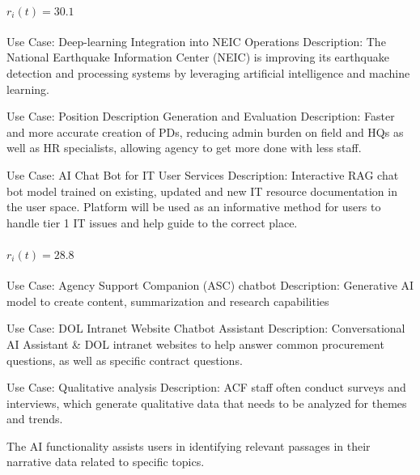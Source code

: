 \paragraph{$r_i(t) = 30.1$}
\begin{description}[style=nextline,leftmargin=1em,font=\normalfont\bfseries]
  \item[Anchor] Use Case: Deep-learning Integration into NEIC Operations
Description: The National Earthquake Information Center (NEIC) is improving its earthquake detection and processing systems by leveraging artificial intelligence and machine learning.
  \item[Human-judged closer] Use Case: Position Description Generation and Evaluation
Description: Faster and more accurate creation of PDs, reducing admin burden on field and HQs as well as HR specialists, allowing agency to get more done with less staff.
  \item[Human-judged farther] Use Case: AI Chat Bot for IT User Services
Description: Interactive RAG chat bot model trained on existing, updated and new IT resource documentation in the user space. Platform will be used as an informative method for users to handle tier 1 IT issues and help guide to the correct place.
\end{description}
\paragraph{$r_i(t) = 28.8$}
\begin{description}[style=nextline,leftmargin=1em,font=\normalfont\bfseries]
  \item[Anchor] Use Case: Agency Support Companion (ASC) chatbot
Description: Generative AI model to create content, summarization and research capabilities
  \item[Human-judged closer] Use Case: DOL Intranet Website Chatbot Assistant
Description: 
Conversational AI Assistant \& DOL intranet websites to help answer common procurement questions, as well as specific contract questions.
  \item[Human-judged farther] Use Case: Qualitative analysis
Description: ACF staff often conduct surveys and interviews, which generate qualitative data that needs to be analyzed for themes and trends.

The AI functionality assists users in identifying relevant passages in their narrative data related to specific topics.
\end{description}
